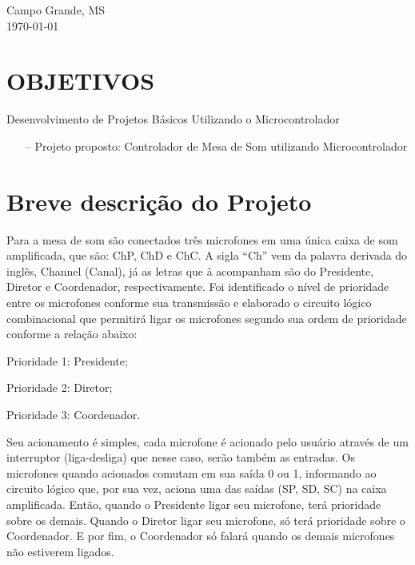 \documentclass{article}
\begin{document}
\begin{titlepage}

	\vfill\vfill\vfill\vfill\vfill\vfill\vfill %
	
	{\large{Campo Grande, MS}\\
	\today} %




	\vfill %

\end{titlepage}

\section{OBJETIVOS}
Desenvolvimento de Projetos Básicos Utilizando o Microcontrolador
\begin{itemize}
	\item[--] Projeto proposto: Controlador de Mesa de Som utilizando Microcontrolador
\end{itemize}
\section{Breve descrição do Projeto}
Para a mesa de som são conectados três microfones em uma única caixa de som amplificada, que são: ChP, ChD e ChC. A sigla “Ch” vem da palavra derivada do inglês, Channel (Canal), já as letras que à acompanham são do Presidente, Diretor e Coordenador, respectivamente. Foi identificado o nível de prioridade entre os microfones conforme sua transmissão e elaborado o circuito lógico combinacional que permitirá ligar os microfones segundo sua ordem de prioridade conforme a relação abaixo:

Prioridade 1: Presidente;

Prioridade 2: Diretor;

Prioridade 3: Coordenador.

Seu acionamento é simples, cada microfone é acionado pelo usuário através de um interruptor (liga-desliga) que nesse caso, serão também as entradas. Os microfones quando acionados comutam em sua saída 0 ou 1, informando ao circuito lógico que, por sua vez, aciona uma das saídas (SP, SD, SC) na caixa amplificada. Então, quando o Presidente ligar seu microfone, terá prioridade sobre os demais. Quando o Diretor ligar seu microfone, só terá prioridade sobre o Coordenador. E por fim, o Coordenador só falará quando os demais microfones não estiverem ligados.
\end{document}
